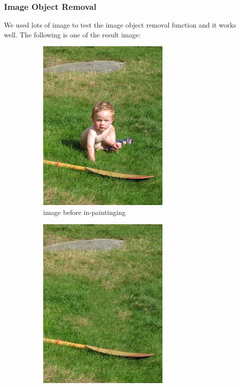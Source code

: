 \documentclass[12pt]{article}
\begin{document}
\subsubsection*{Image Object Removal}
\qquad We used lots of image to test the image object removal function and it works well. The following is one of the result image:
\begin{figure}[H]
	\begin{subfigure}[pos]{.5\textwidth}
		\centering
		\includegraphics*[width=0.8\linewidth]{kid.jpg}
		\caption{image before in-paintinging}
	\end{subfigure}%
	\begin{subfigure}[pos]{.5\textwidth}
		\centering
		\includegraphics*[width=0.8\linewidth]{kid_result.jpg}

\end{subfigure}
\end{figure}
\end{document}
